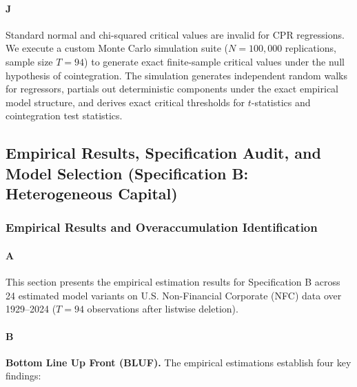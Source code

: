 \paragraph{J}
Standard normal and chi-squared critical values are invalid for CPR regressions. We execute a custom Monte Carlo simulation suite ($N = 100,000$ replications, sample size $T = 94$) to generate exact finite-sample critical values under the null hypothesis of cointegration. The simulation generates independent random walks for regressors, partials out deterministic components under the exact empirical model structure, and derives exact critical thresholds for $t$-statistics and cointegration test statistics.

\subsection{Empirical Results, Specification Audit, and Model Selection (Specification B: Heterogeneous Capital)}

\subsubsection{Empirical Results and Overaccumulation Identification}

\paragraph{A}
This section presents the empirical estimation results for Specification B across 24 estimated model variants on U.S. Non-Financial Corporate (NFC) data over 1929–2024 ($T = 94$ observations after listwise deletion).

\paragraph{B}
\textbf{Bottom Line Up Front (BLUF).} The empirical estimations establish four key findings:

